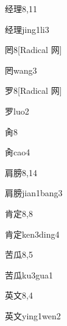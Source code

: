 \begin{entry}{经理}{8,11}
  \begin{phonetics}{经理}{jing1li3}
  \end{phonetics}
\end{entry}

\begin{entry}{罔}{8}[Radical 网]
  \begin{phonetics}{罔}{wang3}
  \end{phonetics}
\end{entry}

\begin{entry}{罗}{8}[Radical 网]
  \begin{phonetics}{罗}{luo2}
  \end{phonetics}
\end{entry}

\begin{entry}{肏}{8}
  \begin{phonetics}{肏}{cao4}
  \end{phonetics}
\end{entry}

\begin{entry}{肩膀}{8,14}
  \begin{phonetics}{肩膀}{jian1bang3}
  \end{phonetics}
\end{entry}

\begin{entry}{肯定}{8,8}
  \begin{phonetics}{肯定}{ken3ding4}
  \end{phonetics}
\end{entry}

\begin{entry}{苦瓜}{8,5}
  \begin{phonetics}{苦瓜}{ku3gua1}
  \end{phonetics}
\end{entry}

\begin{entry}{英文}{8,4}
  \begin{phonetics}{英文}{ying1wen2}
  \end{phonetics}
\end{entry}

